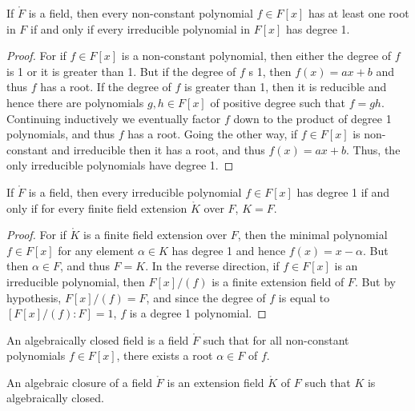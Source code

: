 \documentclass{article}                                                        %
\begin{document}
        \begin{theorem}
            If $\ring{F}$ is a field, then every non-constant polynomial
            $f\in{F}[x]$ has at least one root in $F$ if and only if every
            irreducible polynomial in $F[x]$ has degree 1.
        \end{theorem}
        \begin{proof}
            For if $f\in{F}[x]$ is a non-constant polynomial, then either
            the degree of $f$ is 1 or it is greater than 1. But if the degree
            of $f$ s 1, then $f(x)=ax+b$ and thus $f$ has a root. If the degree
            of $f$ is greater than 1, then it is reducible and hence there
            are polynomials $g,h\in{F}[x]$ of positive degree such that
            $f=gh$. Continuing inductively we eventually factor $f$ down to the
            product of degree 1 polynomials, and thus $f$ has a root. Going the
            other way, if $f\in{F}[x]$ is non-constant and irreducible then it
            has a root, and thus $f(x)=ax+b$. Thus, the only irreducible
            polynomials have degree 1.
        \end{proof}
        \begin{theorem}
            If $\ring{F}$ is a field, then every irreducible polynomial
            $f\in{F}[x]$ has degree 1 if and only if for every finite field
            extension $\ring{K}$ over $F$, $K=F$.
        \end{theorem}
        \begin{proof}
            For if $\ring{K}$ is a finite field extension over $F$, then the
            minimal polynomial $f\in{F}[x]$ for any element $\alpha\in{K}$ has
            degree 1 and hence $f(x)=x-\alpha$. But then $\alpha\in{F}$, and
            thus $F=K$. In the reverse direction, if $f\in{F}[x]$ is an
            irreducible polynomial, then $F[x]/(f)$ is a finite extension field
            of $F$. But by hypothesis, $F[x]/(f)=F$, and since the degree of
            $f$ is equal to $[F[x]/(f):F]=1$, $f$ is a degree 1 polynomial.
        \end{proof}
        \begin{definition}
            An algebraically closed field is a field $\ring{F}$ such that for
            all non-constant polynomials $f\in{F}[x]$, there exists a root
            $\alpha\in{F}$ of $f$.
        \end{definition}
        \begin{definition}
            An algebraic closure of a field $\ring{F}$ is an extension field
            $\ring{K}$ of $F$ such that $K$ is algebraically closed.
        \end{definition}
\end{document}
